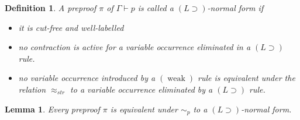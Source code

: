 \documentclass[english,letter paper,12pt,leqno]{article}
\newtheorem{lemma}[theorem]{Lemma}
\theoremstyle{example}
\newtheorem{definition}[theorem]{Definition}
\numberwithin{equation}{section}
\def\imp{\supset}
\begin{document}
\begin{definition}\label{definition:Limp_normal_form} A preproof $\pi$ of $\Gamma \vdash p$ is called a \emph{$(L \imp)$-normal form} if 
\begin{itemize}
\item[(i)] it is cut-free and well-labelled
\item[(ii)] no contraction is active for a variable occurrence eliminated in a $(L \imp)$ rule.
\item[(iii)] no variable occurrence introduced by a $(\operatorname{weak})$ rule is equivalent under the relation $\approx_{str}$ to a variable occurrence eliminated by a $(L \imp)$ rule.
\end{itemize}
\end{definition}

\begin{lemma}\label{lemma:L_normal_form} Every preproof $\pi$ is equivalent under $\sim_p$ to a $(L \imp)$-normal form.
\end{lemma}
\end{document}
